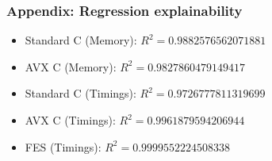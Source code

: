 \documentclass{beamer}
\begin{document}
\begin{frame}
    \frametitle{Appendix: Regression explainability}
    \begin{itemize}
        \item[] Standard C (Memory): $R^2 = 0.9882576562071881$
        \vspace{0.5cm}
        \item[] AVX C (Memory): $R^2 = 0.9827860479149417$
        \vspace{0.5cm}
        \item[] Standard C (Timings): $R^2 = 0.9726777811319699$
        \vspace{0.5cm}
        \item[] AVX C (Timings): $R^2 = 0.9961879594206944$
        \vspace{0.5cm}
        \item[] FES (Timings): $R^2 = 0.9999552224508338$
    \end{itemize}
\end{frame}
\end{document}

